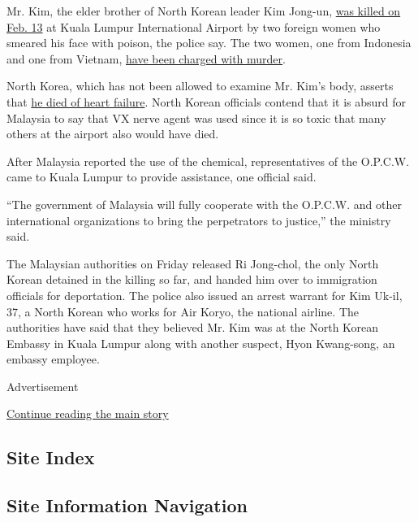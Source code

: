 Mr. Kim, the elder brother of North Korean leader Kim Jong-un,
\href{https://www.nytimes3xbfgragh.onion/2017/02/22/world/asia/kim-jong-nam-assassination-korea-malaysia.html}{was
killed on Feb. 13} at Kuala Lumpur International Airport by two foreign
women who smeared his face with poison, the police say. The two women,
one from Indonesia and one from Vietnam,
\href{https://www.nytimes3xbfgragh.onion/2017/02/28/world/asia/north-korea-kim-jong-nam-death.html}{have
been charged with murder}.

North Korea, which has not been allowed to examine Mr. Kim's body,
asserts that
\href{https://www.nytimes3xbfgragh.onion/2017/03/01/world/asia/kim-jong-nam-assassination-north-korea-visa-malaysia.html}{he
died of heart failure}. North Korean officials contend that it is absurd
for Malaysia to say that VX nerve agent was used since it is so toxic
that many others at the airport also would have died.

After Malaysia reported the use of the chemical, representatives of the
O.P.C.W. came to Kuala Lumpur to provide assistance, one official said.

``The government of Malaysia will fully cooperate with the O.P.C.W. and
other international organizations to bring the perpetrators to
justice,'' the ministry said.

The Malaysian authorities on Friday released Ri Jong-chol, the only
North Korean detained in the killing so far, and handed him over to
immigration officials for deportation. The police also issued an arrest
warrant for Kim Uk-il, 37, a North Korean who works for Air Koryo, the
national airline. The authorities have said that they believed Mr. Kim
was at the North Korean Embassy in Kuala Lumpur along with another
suspect, Hyon Kwang-song, an embassy employee.

Advertisement

\protect\hyperlink{after-bottom}{Continue reading the main story}

\hypertarget{site-index}{%
\subsection{Site Index}\label{site-index}}

\hypertarget{site-information-navigation}{%
\subsection{Site Information
Navigation}\label{site-information-navigation}}

